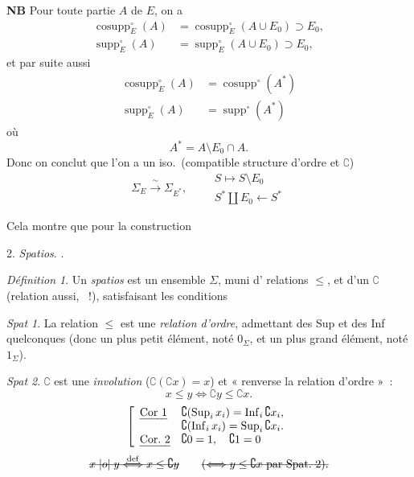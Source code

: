 \documentclass[11pt,a4paper]{article}
\begin{document}
\textbf{NB} Pour toute partie $A$ de $E$, on a
\begin{align*}
\operatorname{cosupp}^{\circ}_{E}(A) &= \operatorname{cosupp}^{\circ}_{E}(A \cup E_0) \supset E_0, \\
\operatorname{supp}^{\circ}_{E}(A) &= \operatorname{supp}^{\circ}_{E}(A \cup E_0) \supset E_0,
\end{align*}
et par suite aussi
\begin{align*}
\operatorname{cosupp}^{\circ}_{E}(A) &= \operatorname{cosupp}^{\circ}(A^{*}) \\
\operatorname{supp}^{\circ}_{E}(A) &= \operatorname{supp}^{\circ}(A^{*})
\end{align*}
où
\[ A^{*} = A \setminus E_0 \cap A. \]
Donc on conclut que l'on a un iso.\ (compatible structure d'ordre et $\complement$)
\[ \Sigma_E \xrightarrow{\ \sim\ } \Sigma_{E^{*}}, \qquad
\begin{array}{l} S \longmapsto S \setminus E_0 \\ S^{*} \amalg E_0 \longleftarrow S^{*} \end{array} \]

Cela montre que pour la construction

2. \emph{Spatios}. .

\emph{Définition 1}. Un \emph{spatios} est un ensemble $\Sigma$, muni d'\struck{\ill{}} relations \struck{$\leq$} $\leq$, \struck{\ill{}} et d'un  $\complement$ (relation aussi, ~!), satisfaisant les conditions

\emph{Spat 1}. La relation $\leq$ est une \emph{relation d'ordre}, admettant des Sup et des Inf quelconques (donc un plus petit élément, noté $0_\Sigma$, et un plus grand élément, noté $1_\Sigma$).

\emph{Spat 2}. $\complement$ est une \emph{involution} ($\complement(\complement x) = x$) et « renverse la relation d'ordre »~:
\[ x \leq y \Longleftrightarrow \complement y \leq \complement x. \]
\[ \left[\begin{array}{ll} \text{\emph{Cor 1}} & \complement(\operatorname*{Sup}_i x_i) = \operatorname*{Inf}_i \complement x_i, \\
 & \complement(\operatorname*{Inf}_i x_i) = \operatorname*{Sup}_i \complement x_i. \\
\text{\emph{Cor.\ 2}} & \complement 0 = 1,\quad \complement 1 = 0 \end{array}\right. \]
\[ \text{\struck{$x \mathrel{|o|} y \overset{\mathrm{def}}{\Longleftrightarrow} x \leq \complement y$}} \qquad \text{\struck{($\Longleftrightarrow y \leq \complement x$ par Spat.\ 2).}} \]
\end{document}
